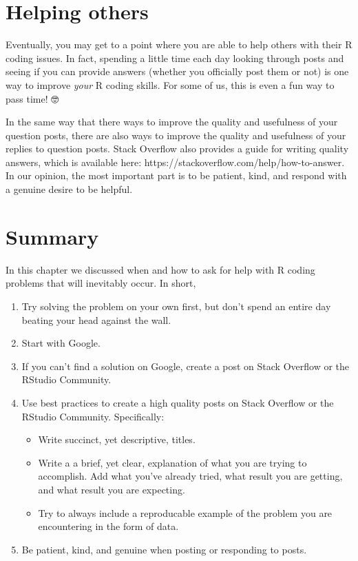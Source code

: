\documentclass[
  letterpaper,
  DIV=11,
  numbers=noendperiod]{scrreprt}
\begin{document}
\section{Helping others}\label{helping-others}

Eventually, you may get to a point where you are able to help others
with their R coding issues. In fact, spending a little time each day
looking through posts and seeing if you can provide answers (whether you
officially post them or not) is one way to improve \emph{your} R coding
skills. For some of us, this is even a fun way to pass time! 🤓

In the same way that there ways to improve the quality and usefulness of
your question posts, there are also ways to improve the quality and
usefulness of your replies to question posts. Stack Overflow also
provides a guide for writing quality answers, which is available here:
https://stackoverflow.com/help/how-to-answer. In our opinion, the most
important part is to be patient, kind, and respond with a genuine desire
to be helpful.

\section{Summary}\label{summary-1}

In this chapter we discussed when and how to ask for help with R coding
problems that will inevitably occur. In short,

\begin{enumerate}
\def\labelenumi{\arabic{enumi}.}
\item
  Try solving the problem on your own first, but don't spend an entire
  day beating your head against the wall.
\item
  Start with Google.
\item
  If you can't find a solution on Google, create a post on Stack
  Overflow or the RStudio Community.
\item
  Use best practices to create a high quality posts on Stack Overflow or
  the RStudio Community. Specifically:

  \begin{itemize}
  \item
    Write succinct, yet descriptive, titles.
  \item
    Write a a brief, yet clear, explanation of what you are trying to
    accomplish. Add what you've already tried, what result you are
    getting, and what result you are expecting.
  \item
    Try to always include a reproducable example of the problem you are
    encountering in the form of data.
  \end{itemize}
\item
  Be patient, kind, and genuine when posting or responding to posts.
\end{enumerate}
\end{document}
